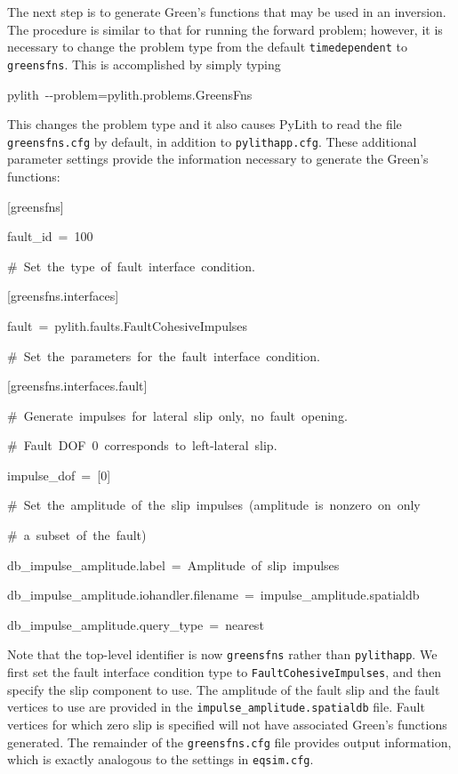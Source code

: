 The next step is to generate Green's functions that may be used in
an inversion. The procedure is similar to that for running the forward
problem; however, it is necessary to change the problem type from
the default \texttt{timedependent} to \texttt{greensfns}. This is
accomplished by simply typing
\begin{lyxcode}
pylith~-{}-problem=pylith.problems.GreensFns
\end{lyxcode}
This changes the problem type and it also causes PyLith to read the
file \texttt{greensfns.cfg} by default, in addition to \texttt{pylithapp.cfg}.
These additional parameter settings provide the information necessary
to generate the Green's functions:
\begin{lyxcode}
{[}greensfns{]}

fault\_id~=~100



\#~Set~the~type~of~fault~interface~condition.

{[}greensfns.interfaces{]}

fault~=~pylith.faults.FaultCohesiveImpulses



\#~Set~the~parameters~for~the~fault~interface~condition.

{[}greensfns.interfaces.fault{]}

\#~Generate~impulses~for~lateral~slip~only,~no~fault~opening.

\#~Fault~DOF~0~corresponds~to~left-lateral~slip.

impulse\_dof~=~{[}0{]}



\#~Set~the~amplitude~of~the~slip~impulses~(amplitude~is~nonzero~on~only

\#~a~subset~of~the~fault)

db\_impulse\_amplitude.label~=~Amplitude~of~slip~impulses

db\_impulse\_amplitude.iohandler.filename~=~impulse\_amplitude.spatialdb

db\_impulse\_amplitude.query\_type~=~nearest
\end{lyxcode}
Note that the top-level identifier is now \texttt{greensfns} rather
than \texttt{pylithapp}. We first set the fault interface condition
type to \texttt{FaultCohesiveImpulses}, and then specify the slip
component to use. The amplitude of the fault slip and the fault vertices
to use are provided in the \texttt{impulse\_amplitude.spatialdb} file.
Fault vertices for which zero slip is specified will not have associated
Green's functions generated. The remainder of the \texttt{greensfns.cfg}
file provides output information, which is exactly analogous to the
settings in \texttt{eqsim.cfg}.

